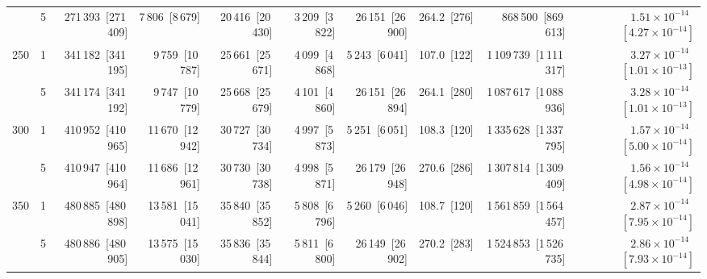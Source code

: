\begin{tabular}{llrrrrrrrr}
 & 5 & 271\,393~{\footnotesize[271\,409]} & 7\,806~{\footnotesize[8\,679]} & 20\,416~{\footnotesize[20\,430]} & 3\,209~{\footnotesize[3\,822]} & 26\,151~{\footnotesize[26\,900]} & 264.2~{\footnotesize[276]} & 868\,500~{\footnotesize[869\,613]} & $1.51\!\times\!10^{-14}$~{\footnotesize $[4.27\!\times\!10^{-14}]$} \\
\cline{1-10}
\multirow[t]{2}{*}{250} & 1 & 341\,182~{\footnotesize[341\,195]} & 9\,759~{\footnotesize[10\,787]} & 25\,661~{\footnotesize[25\,671]} & 4\,099~{\footnotesize[4\,868]} & 5\,243~{\footnotesize[6\,041]} & 107.0~{\footnotesize[122]} & 1\,109\,739~{\footnotesize[1\,111\,317]} & $3.27\!\times\!10^{-14}$~{\footnotesize $[1.01\!\times\!10^{-13}]$} \\
 & 5 & 341\,174~{\footnotesize[341\,192]} & 9\,747~{\footnotesize[10\,779]} & 25\,668~{\footnotesize[25\,679]} & 4\,101~{\footnotesize[4\,860]} & 26\,151~{\footnotesize[26\,894]} & 264.1~{\footnotesize[280]} & 1\,087\,617~{\footnotesize[1\,088\,936]} & $3.28\!\times\!10^{-14}$~{\footnotesize $[1.01\!\times\!10^{-13}]$} \\
\cline{1-10}
\multirow[t]{2}{*}{300} & 1 & 410\,952~{\footnotesize[410\,965]} & 11\,670~{\footnotesize[12\,942]} & 30\,727~{\footnotesize[30\,734]} & 4\,997~{\footnotesize[5\,873]} & 5\,251~{\footnotesize[6\,051]} & 108.3~{\footnotesize[120]} & 1\,335\,628~{\footnotesize[1\,337\,795]} & $1.57\!\times\!10^{-14}$~{\footnotesize $[5.00\!\times\!10^{-14}]$} \\
 & 5 & 410\,947~{\footnotesize[410\,964]} & 11\,686~{\footnotesize[12\,961]} & 30\,730~{\footnotesize[30\,738]} & 4\,998~{\footnotesize[5\,871]} & 26\,179~{\footnotesize[26\,948]} & 270.6~{\footnotesize[286]} & 1\,307\,814~{\footnotesize[1\,309\,409]} & $1.56\!\times\!10^{-14}$~{\footnotesize $[4.98\!\times\!10^{-14}]$} \\
\cline{1-10}
\multirow[t]{2}{*}{350} & 1 & 480\,885~{\footnotesize[480\,898]} & 13\,581~{\footnotesize[15\,041]} & 35\,840~{\footnotesize[35\,852]} & 5\,808~{\footnotesize[6\,796]} & 5\,260~{\footnotesize[6\,046]} & 108.7~{\footnotesize[120]} & 1\,561\,859~{\footnotesize[1\,564\,457]} & $2.87\!\times\!10^{-14}$~{\footnotesize $[7.95\!\times\!10^{-14}]$} \\
 & 5 & 480\,886~{\footnotesize[480\,905]} & 13\,575~{\footnotesize[15\,030]} & 35\,836~{\footnotesize[35\,844]} & 5\,811~{\footnotesize[6\,800]} & 26\,149~{\footnotesize[26\,902]} & 270.2~{\footnotesize[283]} & 1\,524\,853~{\footnotesize[1\,526\,735]} & $2.86\!\times\!10^{-14}$~{\footnotesize $[7.93\!\times\!10^{-14}]$} \\

\end{tabular}
